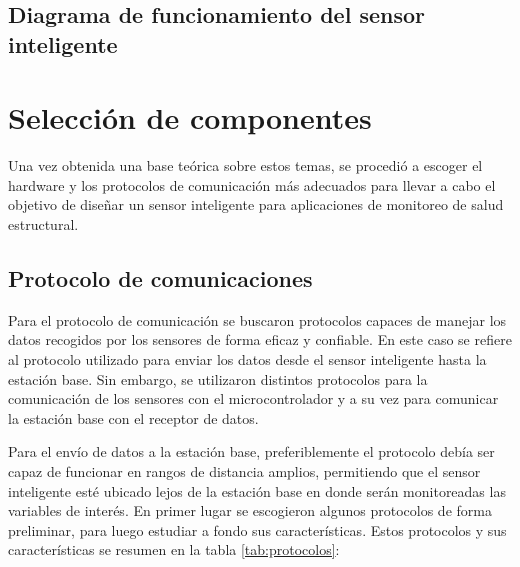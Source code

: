 \subsection{Diagrama de funcionamiento del sensor inteligente}

\section{Selección de componentes}

Una vez obtenida una base teórica sobre estos temas, se procedió a escoger el hardware y los protocolos de comunicación más adecuados para llevar a cabo el objetivo de diseñar un sensor inteligente para aplicaciones de monitoreo de salud estructural. 
	

\subsection{Protocolo de comunicaciones}

Para el protocolo de comunicación se buscaron protocolos capaces de manejar los datos recogidos por los sensores de forma eficaz y confiable. En este caso se refiere al protocolo utilizado para enviar los datos desde el sensor inteligente hasta la estación base. Sin embargo, se utilizaron distintos protocolos para la comunicación de los sensores con el microcontrolador y a su vez para comunicar la estación base con el receptor de datos.
	
Para el envío de datos a la estación base, preferiblemente el protocolo debía ser capaz de funcionar en rangos de distancia amplios, permitiendo que el sensor inteligente esté ubicado lejos de la estación base en donde serán monitoreadas las variables de interés. En primer lugar se escogieron algunos protocolos de forma preliminar, para luego estudiar a fondo sus características. Estos protocolos y sus características se resumen en la tabla \ref{tab:protocolos}:

